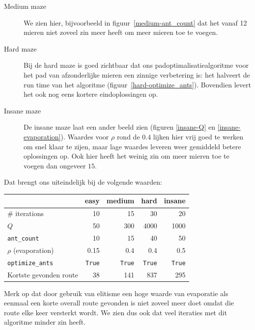 \documentclass[a4paper,10pt,fleqn]{article}
\begin{document}
\begin{enumerate}[1.]
\begin{description}
        \item[Medium maze]
        We zien hier, bijvoorbeeld in figuur~\ref{medium-ant_count} dat het vanaf 12 mieren niet zoveel zin meer heeft om meer mieren toe te voegen.

        \item[Hard maze]
        Bij de hard maze is goed zichtbaar dat ons padoptimalisatiealgoritme voor het pad van afzonderlijke mieren een zinnige verbetering is: het halveert de run time van het algoritme (figuur~\ref{hard-optimize_ants}). Bovendien levert het ook nog eens kortere eindoplossingen op.

        \item[Insane maze]
        De insane maze laat een ander beeld zien (figuren \ref{insane-Q} en \ref{insane-evaporation}). Waardes voor $\rho$ rond de $0.4$ lijken hier vrij goed te werken om snel klaar te zijen, maar lage waardes leveren weer gemiddeld betere oplossingen op. Ook hier heeft het weinig zin om meer mieren toe te voegen dan ongeveer $15$.
    \end{description}


    Dat brengt ons uiteindelijk bij de volgende waarden:

    \begin{center}
    \newcommand\true{\texttt{True}}
    \begin{tabular}{l|rrrr}
                                & easy  & medium    & hard  & insane \\ \hline \hline
        \# iterations           & 10    & 15        & 30    & 20     \\
        $Q$                     & 50    & 300       & 4000  & 1000   \\
        \verb|ant_count|        & 10    & 15        & 40    & 50     \\
        $\rho$ (evaporation)    & 0.15  & 0.4       & 0.4   & 0.5    \\
        \verb|optimize_ants|    & \true & \true     & \true & \true  \\ \hline
        Kortste gevonden route  & 38    & 141       & 837   & 295    \\

    \end{tabular}
    \end{center}
    Merk op dat door gebruik van elitisme een hoge waarde van evaporatie als eenmaal een korte overall route gevonden is niet zoveel meer doet omdat die route elke keer versterkt wordt. We zien dus ook dat veel iteraties met dit algoritme minder zin heeft.



\end{enumerate}
\end{document}
